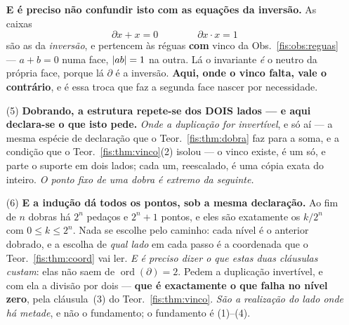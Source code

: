 \documentclass[livro.tex]{subfiles}
\begin{document}
\begin{teorema}
\begin{enumerate}
\smallskip\noindent\textbf{E é preciso não confundir isto com as equações da
inversão.} As caixas
\[
\partial x+x=0\qquad\qquad \partial x\cdot x=1
\]
são as da \emph{inversão}, e pertencem às réguas \textbf{com} vinco da
Obs.~\ref{fis:obs:reguas} --- $a+b=0$ numa face, $\abs{ab}=1$ na outra. Lá o
invariante \emph{é} o neutro da própria face, porque lá $\partial$ é a inversão.
\textbf{Aqui, onde o vinco falta, vale o contrário}, e é essa troca que faz a
segunda face nascer por necessidade.
\item[(5)] \textbf{Dobrando, a estrutura repete-se dos DOIS lados --- e aqui
declara-se o que isto pede.} \emph{Onde a duplicação for invertível}, e só aí ---
a mesma espécie de declaração que o Teor.~\ref{fis:thm:dobra} faz para a soma,
e a condição que o Teor.~\ref{fis:thm:vinco}(2) isolou --- o vinco existe, é um
só, e parte o suporte em dois lados; cada um, reescalado, é uma cópia exata do
inteiro. \emph{O ponto fixo de uma dobra é extremo da seguinte.}
\item[(6)] \textbf{E a indução dá todos os pontos, sob a mesma declaração.} Ao
fim de $n$ dobras há $2^{n}$ pedaços e $2^{n}+1$ pontos, e eles são exatamente
os $k/2^{n}$ com $0\le k\le 2^{n}$. Nada se escolhe pelo caminho: cada nível é o
anterior dobrado, e a escolha de \emph{qual lado} em cada passo é a coordenada
que o Teor.~\ref{fis:thm:coord} vai ler.
\smallskip
\emph{E é preciso dizer o que estas duas cláusulas custam}: elas não saem de
$\operatorname{ord}(\partial)=2$. Pedem a duplicação invertível, e com ela a
divisão por dois --- \textbf{que é exactamente o que falha no nível zero}, pela
cláusula~(3) do Teor.~\ref{fis:thm:vinco}. \emph{São a realização do lado onde há
metade}, e não o fundamento; o fundamento é (1)--(4).
\end{enumerate}
\end{teorema}
\end{document}
